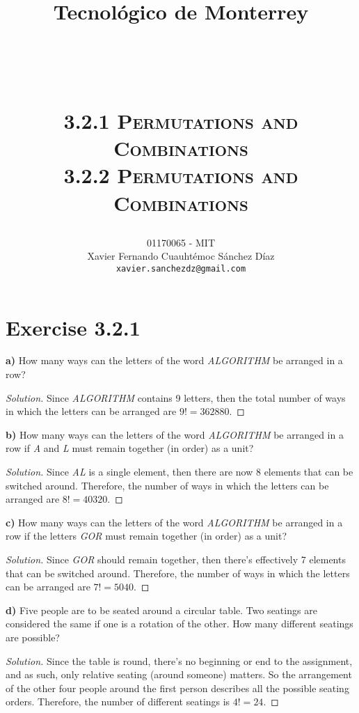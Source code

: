 \documentclass[titlepage, letterpaper, fleqn]{article}
\title{
\vspace{1in}
\textbf{Tecnológico de Monterrey} \\
\vspace{0.5in}
\textmd{\mahclass} \\
\large{\textit{\mahteacher}} \\
\vspace{0.5in}
\textsc{\mahtitle}\\
\textsc{3.2.1 Permutations and Combinations}\\
\textsc{3.2.2 Permutations and Combinations}\\
\author{01170065  - MIT \\
Xavier Fernando Cuauhtémoc Sánchez Díaz \\
\texttt{xavier.sanchezdz@gmail.com}}
\date{\mahdate}
}
\newcommand{\spacepls}{\vspace{5mm}}
\renewcommand\qedsymbol{\(\blacksquare\)}
\newenvironment{solution}
{\renewcommand\qedsymbol{$\square$}\begin{proof}[Solution]}
{\end{proof}}
\begin{document}
\begin{titlepage}
\maketitle
\end{titlepage}

%
%

\section{Exercise 3.2.1}

{\large \textbf{a)} How many ways can the letters of the word \textit{ALGORITHM} be arranged in a row?}

\begin{solution}
Since \textit{ALGORITHM} contains 9 letters, then the total number of ways in which the letters can be arranged are \(9! = 362880\).
\end{solution}

\spacepls

{\large \textbf{b)} How many ways can the letters of the word \textit{ALGORITHM} be arranged in a row if \textit{A} and \textit{L} must remain together (in order) as a unit?}

\begin{solution}
Since \textit{AL} is a single element, then there are now 8 elements that can be switched around. Therefore, the number of ways in which the letters can be arranged are \(8! = 40320\).
\end{solution}

\spacepls

{\large \textbf{c)} How many ways can the letters of the word \textit{ALGORITHM} be arranged in a row if the letters \textit{GOR} must remain together (in order) as a unit?}

\begin{solution}
Since \textit{GOR} should remain together, then there's effectively 7 elements that can be switched around. Therefore, the number of ways in which the letters can be arranged are \(7! = 5040\).
\end{solution}

\spacepls

{\large \textbf{d)} Five people are to be seated around a circular table. Two seatings are considered the same if one is a rotation of the other. How many different seatings are possible?}

\begin{solution}
Since the table is round, there's no beginning or end to the assignment, and as such, only relative seating (around someone) matters.
So the arrangement of the other four people around the first person describes all the possible seating orders.
Therefore, the number of different seatings is \(4! = 24\).
\end{solution}
\end{document}

